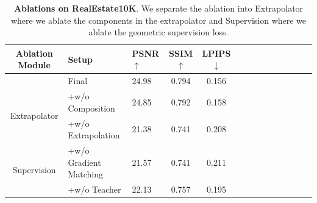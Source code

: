 \begin{table}[ht!]
\begin{center}
\footnotesize
    \begin{tabular}{cllccccccccccc}
    \toprule
    Ablation Module &Setup  & PSNR$\uparrow$ & SSIM$\uparrow$ & LPIPS$\downarrow$ \\
    \midrule
     \cellcolor{Gray}&\cellcolor{Gray}Final & \cellcolor{Gray}24.98 & \cellcolor{Gray}0.794 & \cellcolor{Gray}0.156 \\
    \midrule
    \multirow{2}{*}{Extrapolator}&+w/o Composition & 24.85  & 0.792  & 0.158 \\
    &+w/o Extrapolation & 21.38 & 0.741 & 0.208 \\
    \midrule
    \multirow{2}{*}{Supervision}&+w/o Gradient Matching & 21.57  & 0.741  & 0.211 \\
    &+w/o Teacher & 22.13  & 0.757  & 0.195 \\
    \bottomrule
    \end{tabular}
\end{center}
    \caption{\textbf{Ablations on RealEstate10K}. We separate the ablation into Extrapolator where we ablate the components in the extrapolator and Supervision where we ablate the geometric supervision loss. }
    \label{tab:ablation}
    
\end{table}